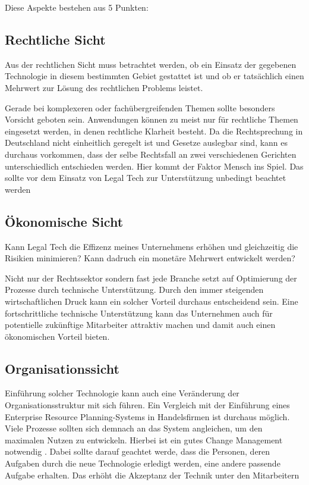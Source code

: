 Diese Aspekte bestehen aus 5 Punkten: 
\subsection{Rechtliche Sicht}
Aus der rechtlichen Sicht muss betrachtet werden, ob ein Einsatz der gegebenen Technologie in diesem bestimmten Gebiet gestattet ist und ob er tatsächlich einen Mehrwert zur Lösung des rechtlichen Problems leistet.

Gerade bei komplexeren oder fachübergreifenden Themen sollte besonders Vorsicht geboten sein. Anwendungen können zu meist nur für rechtliche Themen eingesetzt werden, in denen rechtliche Klarheit besteht. Da die Rechtsprechung in Deutschland nicht einheitlich geregelt ist und Gesetze auslegbar sind, kann es durchaus vorkommen, dass der selbe Rechtsfall an zwei verschiedenen Gerichten unterschiedlich entschieden werden. Hier kommt der Faktor Mensch ins Spiel. Das sollte vor dem Einsatz von Legal Tech zur Unterstützung unbedingt beachtet werden

\subsection{Ökonomische Sicht}
Kann Legal Tech die Effizenz meines Unternehmens erhöhen und gleichzeitig die Risikien minimieren? Kann dadruch ein monetäre Mehrwert entwickelt werden?

Nicht nur der Rechtssektor sondern fast jede Branche setzt auf Optimierung der Prozesse durch technische Unterstützung. Durch den immer steigenden wirtschaftlichen Druck kann ein solcher Vorteil durchaus entscheidend sein. Eine fortschrittliche technische Unterstützung kann das Unternehmen auch für potentielle zukünftige Mitarbeiter attraktiv machen und damit auch einen ökonomischen Vorteil bieten. 

\subsection{Organisationssicht}
Einführung solcher Technologie kann auch eine Veränderung der Organisationsstruktur mit sich führen. Ein Vergleich mit der Einführung eines Enterprise Resource Planning-Systems in Handelsfirmen ist durchaus möglich. Viele Prozesse sollten sich demnach an das System angleichen, um den maximalen Nutzen zu entwickeln. Hierbei ist ein gutes Change Management notwendig . Dabei sollte darauf geachtet werde, dass die Personen, deren Aufgaben durch die neue Technologie erledigt werden, eine andere passende Aufgabe erhalten. Das erhöht die Akzeptanz der Technik unter den Mitarbeitern


